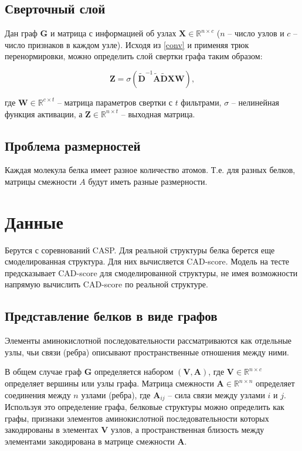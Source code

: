 \documentclass[12pt,twosides]{article}
\begin{document}
	
	\subsection{Сверточный слой}
	
	Дан граф $\mathbf{G}$ и матрица с информацией об узлах $\mathbf{X} \in \mathbb{R}^{n \times c}$ ($n$ -- число узлов и $c$ -- число признаков в каждом узле). Исходя из \ref{conv} и применяя трюк перенормировки, можно определить слой свертки графа таким образом:
	
	$$\mathbf{Z}=\sigma\left(\tilde{\mathbf{D}}^{-1} \tilde{\mathbf{A}}\tilde{\mathbf{D}} \mathbf{X} \mathbf{W}\right),$$
	
	где $\mathbf{W} \in \mathbb{R}^{c \times t}$ – матрица параметров свертки с $t$ фильтрами, $\sigma$ – нелинейная функция активации, а $\mathbf{Z} \in \mathbb{R}^{n \times t}$ -- выходная матрица.
	
	\subsection{Проблема размерностей}
	Каждая молекула белка имеет разное количество атомов. Т.е. для разных белков, матрицы смежности $A$ будут иметь разные размерности.
	
		
	
	\section{Данные}
	Берутся с соревнований CASP. Для реальной структуры белка берется еще смоделированная структура. Для них вычисляется CAD-score. Модель на тесте предсказывает CAD-score для смоделированной структуры, не имея возможности напрямую вычислить CAD-score по реальной структуре.
	
	\subsection{Представление белков в виде графов}
	Элементы аминокислотной последовательности рассматриваются как отдельные узлы, чьи связи (ребра) описывают пространственные отношения между ними. 
	
	В общем случае граф $\mathbf{G}$ определяется набором $\mathbf{(V, A)}$, где $\mathbf{V}\in \mathbb{R}^{n \times c}$ определяет вершины или узлы графа. Матрица смежности $\mathbf{A}\in \mathbb{R}^{n \times n}$ определяет соединения между $n$ узлами (ребра), где $\mathbf{A}_{ij}$ – сила связи между узлами $i$ и $j$. Используя это определение графа, белковые структуры можно определить как графы, признаки элементов аминокислотной последовательности которых закодированы в элементах $\mathbf{V}$ узлов, а пространственная близость между элементами закодирована в матрице смежности $\mathbf{A}$.
	
\end{document}
